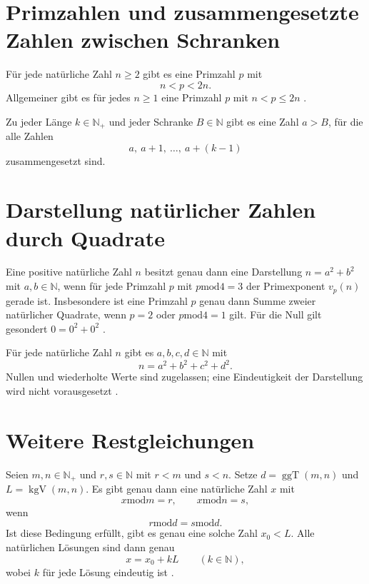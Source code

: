 \section{Primzahlen und zusammengesetzte Zahlen zwischen Schranken}

\begin{theorem}
\label{b10guide:thm:bertrand}
Für jede natürliche Zahl $n\ge2$ gibt es eine Primzahl $p$ mit
\[
 n<p<2n.
\]
Allgemeiner gibt es für jedes $n\ge1$ eine Primzahl $p$ mit
$n<p\le2n$ \cite{natbertrand}.
\end{theorem}

\begin{theorem}
\label{b10guide:thm:composite-blocks}
Zu jeder Länge $k\in\mathbb N_+$ und jeder Schranke $B\in\mathbb N$
gibt es eine Zahl $a>B$, für die alle Zahlen
\[
 a,\ a+1,\ \ldots,\ a+(k-1)
\]
zusammengesetzt sind.
\end{theorem}

\section{Darstellung natürlicher Zahlen durch Quadrate}

\begin{theorem}
\label{b10guide:thm:two-squares}
Eine positive natürliche Zahl $n$ besitzt genau dann eine Darstellung
$n=a^2+b^2$ mit $a,b\in\mathbb N$, wenn für jede Primzahl $p$ mit
$p\mathbin{\mathrm{mod}}4=3$ der Primexponent $v_p(n)$ gerade ist.
Insbesondere ist eine Primzahl $p$ genau dann Summe zweier
natürlicher Quadrate, wenn $p=2$ oder
$p\mathbin{\mathrm{mod}}4=1$ gilt.
Für die Null gilt gesondert $0=0^2+0^2$ \cite{natsquares}.
\end{theorem}

\begin{theorem}
\label{b10guide:thm:four-squares}
Für jede natürliche Zahl $n$ gibt es $a,b,c,d\in\mathbb N$ mit
\[
 n=a^2+b^2+c^2+d^2.
\]
Nullen und wiederholte Werte sind zugelassen; eine Eindeutigkeit
der Darstellung wird nicht vorausgesetzt \cite{natsquares}.
\end{theorem}

\section{Weitere Restgleichungen}

\begin{theorem}
\label{b10guide:thm:general-chinese-remainder}
Seien $m,n\in\mathbb N_+$ und $r,s\in\mathbb N$ mit $r<m$ und $s<n$.
Setze $d=\operatorname{ggT}(m,n)$ und $L=\operatorname{kgV}(m,n)$.
Es gibt genau dann eine natürliche Zahl $x$ mit
\[
 x\mathbin{\mathrm{mod}}m=r,\qquad
 x\mathbin{\mathrm{mod}}n=s,
\]
wenn
\[
 r\mathbin{\mathrm{mod}}d=s\mathbin{\mathrm{mod}}d.
\]
Ist diese Bedingung erfüllt, gibt es genau eine solche Zahl $x_0<L$.
Alle natürlichen Lösungen sind dann genau
\[
 x=x_0+kL\qquad(k\in\mathbb N),
\]
wobei $k$ für jede Lösung eindeutig ist \cite{natchinese}.
\end{theorem}

